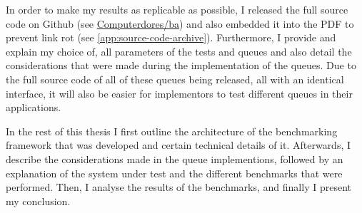 In order to make my results as replicable as possible, I released the full source code on Github (see \href{https://github.com/Computerdores/ba}{Computerdores/ba}) and also embedded it into the PDF to prevent link rot (see \autoref{app:source-code-archive}).
Furthermore, I provide and explain my choice of, all parameters of the tests and queues and also detail the considerations that were made during the implementation of the queues.
Due to the full source code of all of these queues being released, all with an identical interface, it will also be easier for implementors to test different queues in their applications.

In the rest of this thesis I first outline the architecture of the benchmarking framework that was developed and certain technical details of it.
Afterwards, I describe the considerations made in the queue implementions, followed by an explanation of the system under test and the different benchmarks that were performed.
Then, I analyse the results of the benchmarks, and finally I present my conclusion.
